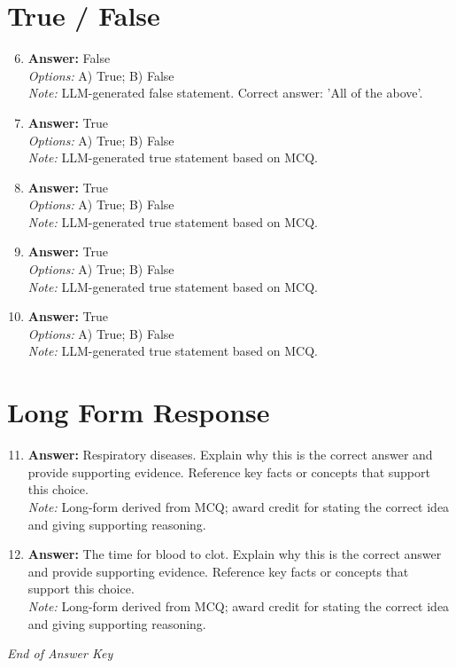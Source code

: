\documentclass[12pt]{article}
\begin{document}
\section*{True / False}
\begin{enumerate}[label=\arabic*.]
\setcounter{enumi}{5}
\item \textbf{Answer:} False
\\ \textit{Options:} A) True; B) False
\\ \textit{Note:} LLM-generated false statement. Correct answer: 'All of the above'.
\item \textbf{Answer:} True
\\ \textit{Options:} A) True; B) False
\\ \textit{Note:} LLM-generated true statement based on MCQ.
\item \textbf{Answer:} True
\\ \textit{Options:} A) True; B) False
\\ \textit{Note:} LLM-generated true statement based on MCQ.
\item \textbf{Answer:} True
\\ \textit{Options:} A) True; B) False
\\ \textit{Note:} LLM-generated true statement based on MCQ.
\item \textbf{Answer:} True
\\ \textit{Options:} A) True; B) False
\\ \textit{Note:} LLM-generated true statement based on MCQ.
\end{enumerate}

\section*{Long Form Response}
\begin{enumerate}[label=\arabic*.]
\setcounter{enumi}{10}
\item \textbf{Answer:} Respiratory diseases. Explain why this is the correct answer and provide supporting evidence. Reference key facts or concepts that support this choice.
\\ \textit{Note:} Long-form derived from MCQ; award credit for stating the correct idea and giving supporting reasoning.
\item \textbf{Answer:} The time for blood to clot. Explain why this is the correct answer and provide supporting evidence. Reference key facts or concepts that support this choice.
\\ \textit{Note:} Long-form derived from MCQ; award credit for stating the correct idea and giving supporting reasoning.
\end{enumerate}

\vfill
\noindent\textit{End of Answer Key}
\end{document}
